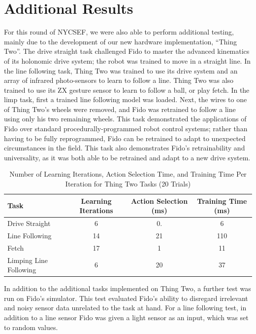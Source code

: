 \documentclass[letterpaper,11pt]{article}
\begin{document}
	\section*{Additional Results}

	For this round of NYCSEF, we were also able to perform additional testing, mainly due to the development of our new hardware implementation, ``Thing Two''.  The drive straight task challenged Fido to master the advanced kinematics of its holonomic drive system; the robot was trained to move in a straight line.  In the line following task, Thing Two was trained to use its drive system and an array of infrared photo-sensors to learn to follow a line.  Thing Two was also trained to use its ZX gesture sensor to learn to follow a ball, or play fetch.   In the limp task, first a trained line following model was loaded.  Next, the wires to one of Thing Two's wheels were removed, and Fido was retrained to follow a line using only his two remaining wheels.  This task demonstrated the applications of Fido over standard procedurally-programmed robot control systems; rather than having to be fully reprogrammed, Fido can be retrained to adapt to unexpected circumstances in the field.  This task also demonstrates Fido's retrainability and universality, as it was both able to be retrained and adapt to a new drive system.

	\begin{table}[ht]
		\centering
		\begin{tabular}{@{}lccc@{}}
			\toprule
			Task                   & Learning Iterations & Action Selection (ms) & Training Time (ms) \\ \midrule
			Drive Straight         & 6                   & 0.                    & 6                  \\
			Line Following         & 14                  & 21                    & 110                \\
			Fetch                  & 17                  & 1                     & 11                 \\
			Limping Line Following & 6                   & 20                    & 37                 \\ \bottomrule
		\end{tabular}
		\caption{Number of Learning Iterations, Action Selection Time, and Training Time Per Iteration for Thing Two Tasks (20 Trials)}
		\label{tab:data}
	\end{table}

	In addition to the additional tasks implemented on Thing Two, a further test was run on Fido's simulator.  This test evaluated Fido's ability to disregard irrelevant and noisy sensor data  unrelated to the task at hand.   For a line following test, in addition to a line sensor Fido was given a light sensor as an input, which was set to random values.
\end{document}
